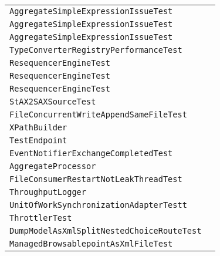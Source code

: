 \begin{center}
\begin{tabular}{ll}
\lstinline/AggregateSimpleExpressionIssueTest/&\raisebox{0pt}{\lstinline/xxxtestAggregateSimpleExpression()/}\\
\lstinline/AggregateSimpleExpressionIssueTest/&\raisebox{0pt}{\lstinline/xxxtestAggregateSimpleExpression()/}\\
\lstinline/AggregateSimpleExpressionIssueTest/&\raisebox{0pt}{\lstinline/xxxtestAggregateSimpleExpression()/}\\
\lstinline/TypeConverterRegistryPerformanceTest/&\raisebox{0pt}{\lstinline/disbledtestPerformance()/}\\
\lstinline/ResequencerEngineTest/&\raisebox{0pt}{\lstinline/testRandom()/}\\
\lstinline/ResequencerEngineTest/&\raisebox{0pt}{\lstinline/testRandom()/}\\
\lstinline/ResequencerEngineTest/&\raisebox{0pt}{\lstinline/testRandom()/}\\
\lstinline/StAX2SAXSourceTest/&\raisebox{0pt}{\lstinline/testDefaultPrefixInRootElementWithCopyTransformer()/}\\
\lstinline/FileConcurrentWriteAppendSameFileTest/&\raisebox{0pt}{\lstinline/testConcurrentAppend()/}\\
\lstinline/XPathBuilder/&\raisebox{0pt}{\lstinline/logDiscoveredNamespaces(NodeListnamespaces)/}\\
\lstinline/TestEndpoint/&\raisebox{0pt}{\lstinline/doStart()/}\\
\lstinline/EventNotifierExchangeCompletedTest/&\raisebox{0pt}{\lstinline/testExchangeCompleted()/}\\
\lstinline/AggregateProcessor/&\raisebox{0pt}{\lstinline/restoreTimeoutMapFromAggregationRepository()/}\\
\lstinline/FileConsumerRestartNotLeakThreadTest/&\raisebox{0pt}{\lstinline/testLeak()/}\\
\lstinline/ThroughputLogger/&\raisebox{0pt}{\lstinline/createGroupIntervalLogMessage()/}\\
\lstinline/UnitOfWorkSynchronizationAdapterTestt/&\raisebox{0pt}{\lstinline/process(Exchange)/}\\
\lstinline/ThrottlerTest/&\raisebox{0pt}{\lstinline/assertThrottlerTiming(longelapsedTimeMs,intthrottle,intintervalMs,int)/}\\
\lstinline/DumpModelAsXmlSplitNestedChoiceRouteTest/&\raisebox{0pt}{\lstinline/testDumpModelAsXml()/}\\
\lstinline/ManagedBrowsablepointAsXmlFileTest/&\raisebox{0pt}{\lstinline/testBrowseablepointAsXmlAllIncludeBody()/}\\

\end{tabular}
\end{center}
